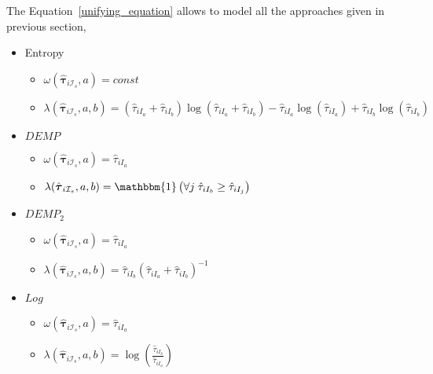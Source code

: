\documentclass[10pt, a4paper]{article}
\newcommand{\m}[1]{\boldsymbol{#1}}
\begin{document}


The Equation~\ref{unifying_equation} allows to model all the approaches given in previous section,
\begin{itemize}
\item Entropy
\begin{itemize}
\item $\omega(\hat{\m \tau}_{i \mathcal{I}_s}, a) = const$
\item $\lambda(\hat{\m \tau}_{i \mathcal{I}_s}, a, b) = (\hat{\tau}_{iI_a}+\hat{\tau}_{iI_b}) \log(\hat{\tau}_{iI_a} + \hat{\tau}_{iI_b}) - \hat{\tau}_{iI_a} \log(\hat{\tau}_{iI_a}) + \hat{\tau}_{iI_b} \log(\hat{\tau}_{iI_b})$
\end{itemize}

\item $DEMP$
\begin{itemize}
\item $\omega(\hat{\m \tau}_{i \mathcal{I}_s}, a) = \hat{\tau}_{iI_a}$
\item $\lambda(\hat{\m \tau}_{i \mathcal{I}_s}, a, b) = \mathbbm{1}\left( \forall j\; \hat{\tau}_{i I_{b}} \geq \hat{\tau}_{iI_j} \right)$
\end{itemize}

\item $DEMP_2$
\begin{itemize}
\item $\omega(\hat{\m \tau}_{i \mathcal{I}_s}, a) = \hat{\tau}_{iI_a}$
\item $\lambda(\hat{\m \tau}_{i \mathcal{I}_s}, a, b) = \hat{\tau}_{iI_b}(\hat{\tau}_{iI_a} + \hat{\tau}_{iI_b})^{-1}$
\end{itemize}

\item $Log$
\begin{itemize}
\item $\omega(\hat{\m \tau}_{i \mathcal{I}_s}, a) = \hat{\tau}_{iI_a}$
\item $\lambda(\hat{\m \tau}_{i \mathcal{I}_s}, a, b) = \log( \frac{ \hat{\tau}_{iI_b} }{ \hat{\tau}_{iI_a} })$
\end{itemize}
\end{itemize}
\end{document}
